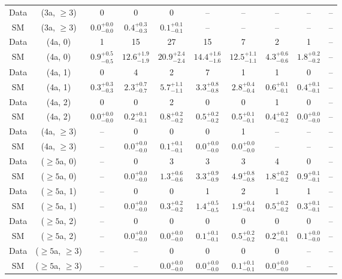 \begin{table}[h!]
{\begin{tabular}{cccccccccc}
	Data & (3a, $\ge3$) & 0 & 0 & 0 & -- & -- & -- & -- & -- \\[0.5ex] 
	SM & (3a, $\ge3$) & $0.0^{+ 0.0 }_{- 0.0 }$ & $0.4^{+ 0.3 }_{- 0.3 }$ & $0.1^{+ 0.1 }_{- 0.1 }$ & -- & -- & -- & -- & -- \\[0.5ex] 
	Data & (4a, 0) & 1 & 15 & 27 & 15 & 7 & 2 & 1 & -- \\[0.5ex] 
	SM & (4a, 0) & $0.9^{+ 0.5 }_{- 0.5 }$ & $12.6^{+ 1.9 }_{- 1.9 }$ & $20.9^{+ 2.4 }_{- 2.4 }$ & $14.4^{+ 1.6 }_{- 1.6 }$ & $12.5^{+ 1.1 }_{- 1.1 }$ & $4.3^{+ 0.6 }_{- 0.6 }$ & $1.8^{+ 0.2 }_{- 0.2 }$ & -- \\[0.5ex] 
	Data & (4a, 1) & 0 & 4 & 2 & 7 & 1 & 1 & 0 & -- \\[0.5ex] 
	SM & (4a, 1) & $0.3^{+ 0.3 }_{- 0.3 }$ & $2.3^{+ 0.7 }_{- 0.7 }$ & $5.7^{+ 1.1 }_{- 1.1 }$ & $3.3^{+ 0.8 }_{- 0.8 }$ & $2.8^{+ 0.4 }_{- 0.4 }$ & $0.6^{+ 0.1 }_{- 0.1 }$ & $0.4^{+ 0.1 }_{- 0.1 }$ & -- \\[0.5ex] 
	Data & (4a, 2) & 0 & 0 & 2 & 0 & 0 & 1 & 0 & -- \\[0.5ex] 
	SM & (4a, 2) & $0.0^{+ 0.0 }_{- 0.0 }$ & $0.2^{+ 0.1 }_{- 0.1 }$ & $0.8^{+ 0.2 }_{- 0.2 }$ & $0.5^{+ 0.2 }_{- 0.2 }$ & $0.5^{+ 0.1 }_{- 0.1 }$ & $0.4^{+ 0.2 }_{- 0.2 }$ & $0.0^{+ 0.0 }_{- 0.0 }$ & -- \\[0.5ex] 
	Data & (4a, $\ge3$) & -- & 0 & 0 & 0 & 1 & -- & -- & -- \\[0.5ex] 
	SM & (4a, $\ge3$) & -- & $0.0^{+ 0.0 }_{- 0.0 }$ & $0.1^{+ 0.1 }_{- 0.1 }$ & $0.0^{+ 0.0 }_{- 0.0 }$ & $0.0^{+ 0.0 }_{- 0.0 }$ & -- & -- & -- \\[0.5ex] 
	Data & ($\ge5$a, 0) & -- & 0 & 3 & 3 & 3 & 4 & 0 & -- \\[0.5ex] 
	SM & ($\ge5$a, 0) & -- & $0.0^{+ 0.0 }_{- 0.0 }$ & $1.3^{+ 0.6 }_{- 0.6 }$ & $3.3^{+ 0.9 }_{- 0.9 }$ & $4.9^{+ 0.8 }_{- 0.8 }$ & $1.8^{+ 0.2 }_{- 0.2 }$ & $0.9^{+ 0.1 }_{- 0.1 }$ & -- \\[0.5ex] 
	Data & ($\ge5$a, 1) & -- & 0 & 0 & 1 & 2 & 1 & 1 & -- \\[0.5ex] 
	SM & ($\ge5$a, 1) & -- & $0.0^{+ 0.0 }_{- 0.0 }$ & $0.3^{+ 0.2 }_{- 0.2 }$ & $1.4^{+ 0.5 }_{- 0.5 }$ & $1.9^{+ 0.4 }_{- 0.4 }$ & $0.5^{+ 0.2 }_{- 0.2 }$ & $0.3^{+ 0.1 }_{- 0.1 }$ & -- \\[0.5ex] 
	Data & ($\ge5$a, 2) & -- & 0 & 0 & 0 & 0 & 0 & 0 & -- \\[0.5ex] 
	SM & ($\ge5$a, 2) & -- & $0.0^{+ 0.0 }_{- 0.0 }$ & $0.0^{+ 0.0 }_{- 0.0 }$ & $0.1^{+ 0.1 }_{- 0.1 }$ & $0.5^{+ 0.2 }_{- 0.2 }$ & $0.2^{+ 0.1 }_{- 0.1 }$ & $0.1^{+ 0.0 }_{- 0.0 }$ & -- \\[0.5ex] 
	Data & ($\ge5$a, $\ge3$) & -- & -- & 0 & 0 & 0 & 0 & -- & -- \\[0.5ex] 
	SM & ($\ge5$a, $\ge3$) & -- & -- & $0.0^{+ 0.0 }_{- 0.0 }$ & $0.0^{+ 0.0 }_{- 0.0 }$ & $0.1^{+ 0.1 }_{- 0.1 }$ & $0.0^{+ 0.0 }_{- 0.0 }$ & -- & -- \\[0.5ex] 
	\hline
	\hline
\end{tabular}}
\end{table}
